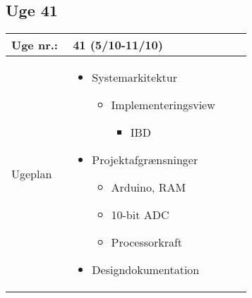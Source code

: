 	\subsection{Uge 41} \label{app:logUge41}
	\begin{longtable}{|p{0.24\linewidth}|p{0.7\linewidth}|}
		\hline
		Uge nr.: & 41 (5/10-11/10)\\ \hline
		Ugeplan & 
		\begin{itemize}
			\item Systemarkitektur
			\begin{itemize} 
				\item Implementeringsview
				\begin{itemize}
					\item IBD 
				\end{itemize}
			\end{itemize}
			\item Projektafgrænsninger
			\begin{itemize}
				\item Arduino, RAM
				\item 10-bit ADC 
				\item Processorkraft 
			\end{itemize}
			\item Designdokumentation
		\end{itemize}
		

\end{longtable}
